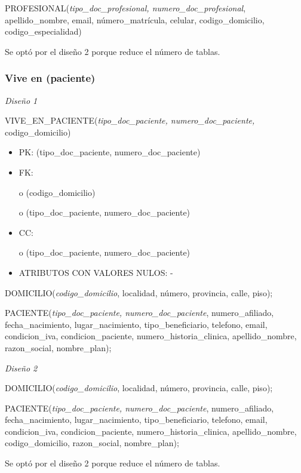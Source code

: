 \documentclass[a4paper,11pt]{article}
\begin{document}
PROFESIONAL(\emph{tipo\_doc\_profesional, numero\_doc\_profesional}, apellido\_nombre, 
email, número\_matrícula, celular,\textit{\textbf{ }}codigo\_domicilio, codigo\_especialidad)

Se optó por el diseño 2 porque reduce el número de tablas.\label{HToc293405843}

\subsubsection{\textbf{Vive en (paciente)}}

\textit{Diseño 1}

VIVE\_EN\_PACIENTE(\emph{tipo\_doc\_paciente, numero\_doc\_paciente,} codigo\_domicilio)

\begin{itemize}
\item PK: (tipo\_doc\_paciente, numero\_doc\_paciente)

\item FK: 

o (codigo\_domicilio)

o (tipo\_doc\_paciente, numero\_doc\_paciente)

\item CC:

o (tipo\_doc\_paciente, numero\_doc\_paciente)

\item ATRIBUTOS CON VALORES NULOS: -
\end{itemize}

DOMICILIO(\emph{codigo\_domicilio}, localidad, número, provincia, calle, piso);

PACIENTE(\emph{tipo\_doc\_paciente, numero\_doc\_paciente}, numero\_afiliado, fecha\_nacimiento, 
lugar\_nacimiento, tipo\_beneficiario, telefono, email, condicion\_iva, condicion\_paciente, 
numero\_historia\_clinica, apellido\_nombre, razon\_social,  nombre\_plan);

\textit{Diseño 2}

DOMICILIO(\emph{codigo\_domicilio}, localidad, número, provincia, calle, piso);

PACIENTE(\emph{tipo\_doc\_paciente, numero\_doc\_paciente}, numero\_afiliado, fecha\_nacimiento, 
lugar\_nacimiento, tipo\_beneficiario, telefono, email, condicion\_iva, condicion\_paciente, 
numero\_historia\_clinica, apellido\_nombre, codigo\_domicilio, razon\_social, 
 nombre\_plan);

Se optó por el diseño 2 porque reduce el número de tablas.\label{HToc293405844}
\end{document}
